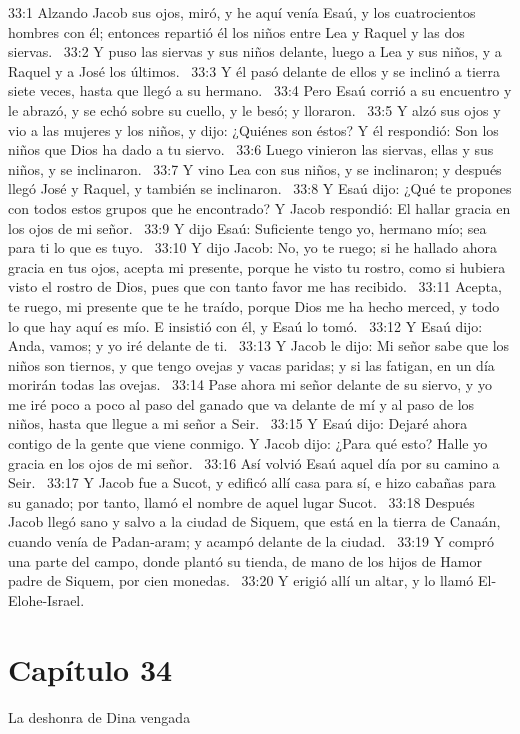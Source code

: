 33:1 Alzando Jacob sus ojos, miró, y he aquí venía Esaú, y los cuatrocientos hombres con él; entonces repartió él los niños entre Lea y Raquel y las dos siervas.  
33:2 Y puso las siervas y sus niños delante, luego a Lea y sus niños, y a Raquel y a José los últimos.  
33:3 Y él pasó delante de ellos y se inclinó a tierra siete veces, hasta que llegó a su hermano.  
33:4 Pero Esaú corrió a su encuentro y le abrazó, y se echó sobre su cuello, y le besó; y lloraron.  
33:5 Y alzó sus ojos y vio a las mujeres y los niños, y dijo: ¿Quiénes son éstos? Y él respondió: Son los niños que Dios ha dado a tu siervo.  
33:6 Luego vinieron las siervas, ellas y sus niños, y se inclinaron.  
33:7 Y vino Lea con sus niños, y se inclinaron; y después llegó José y Raquel, y también se inclinaron.  
33:8 Y Esaú dijo: ¿Qué te propones con todos estos grupos que he encontrado? Y Jacob respondió: El hallar gracia en los ojos de mi señor.  
33:9 Y dijo Esaú: Suficiente tengo yo, hermano mío; sea para ti lo que es tuyo.  
33:10 Y dijo Jacob: No, yo te ruego; si he hallado ahora gracia en tus ojos, acepta mi presente, porque he visto tu rostro, como si hubiera visto el rostro de Dios, pues que con tanto favor me has recibido.  
33:11 Acepta, te ruego, mi presente que te he traído, porque Dios me ha hecho merced, y todo lo que hay aquí es mío. E insistió con él, y Esaú lo tomó.  
33:12 Y Esaú dijo: Anda, vamos; y yo iré delante de ti.  
33:13 Y Jacob le dijo: Mi señor sabe que los niños son tiernos, y que tengo ovejas y vacas paridas; y si las fatigan, en un día morirán todas las ovejas.  
33:14 Pase ahora mi señor delante de su siervo, y yo me iré poco a poco al paso del ganado que va delante de mí y al paso de los niños, hasta que llegue a mi señor a Seir.  
33:15 Y Esaú dijo: Dejaré ahora contigo de la gente que viene conmigo. Y Jacob dijo: ¿Para qué esto? Halle yo gracia en los ojos de mi señor.  
33:16 Así volvió Esaú aquel día por su camino a Seir.  
33:17 Y Jacob fue a Sucot, y edificó allí casa para sí, e hizo cabañas para su ganado; por tanto, llamó el nombre de aquel lugar Sucot.  
33:18 Después Jacob llegó sano y salvo a la ciudad de Siquem, que está en la tierra de Canaán, cuando venía de Padan-aram; y acampó delante de la ciudad.  
33:19 Y compró una parte del campo, donde plantó su tienda, de mano de los hijos de Hamor padre de Siquem, por cien monedas.  
33:20 Y erigió allí un altar, y lo llamó El-Elohe-Israel.  
\section*{Capítulo 34}
La deshonra de Dina vengada  

